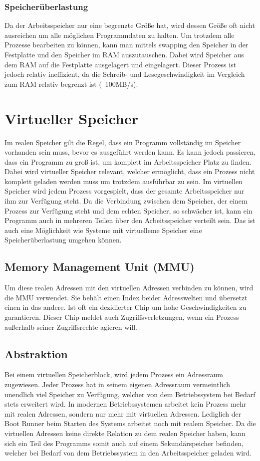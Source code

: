 \documentclass{article}
\begin{document}
	\subsubsection{Speicherüberlastung}
	Da der Arbeitsspeicher nur eine begrenzte Größe hat, wird dessen Größe oft nicht ausreichen um alle möglichen Programmdaten zu halten. Um trotzdem alle Prozesse bearbeiten zu können, kann man mittels swapping den Speicher in der Festplatte und den Speicher im RAM auszutauschen. Dabei wird Speicher aus dem RAM auf die Festplatte ausgelagert und eingelagert. Dieser Prozess ist jedoch relativ ineffizient, da die Schreib- und Lesegeschwindigkeit im Vergleich zum RAM relativ begrenzt ist (~{}100MB/s).
	\section{Virtueller Speicher}
	Im realen Speicher gilt die Regel, dass ein Programm vollständig im Speicher vorhanden sein muss, bevor es ausgeführt werden kann. Es kann jedoch passieren, dass ein Programm zu groß ist, um komplett im Arbeitsspeicher Platz zu finden. Dabei wird virtueller Speicher relevant, welcher ermöglicht, dass ein Prozess nicht komplett geladen werden muss um trotzdem ausführbar zu sein. Im virtuellen Speicher wird jedem Prozess vorgespielt, dass der gesamte Arbeitsspeicher nur ihm zur Verfügung steht. Da die Verbindung zwischen dem Speicher, der einem Prozess zur Verfügung steht und dem echten Speicher, so schwächer ist, kann ein Programm auch in mehreren Teilen über den Arbeitsspeicher verteilt sein. Das ist auch eine Möglichkeit wie Systeme mit virtuelleme Speicher eine Speicherüberlastung umgehen können.
	\subsection{Memory Management Unit (MMU)}
	Um diese realen Adressen mit den virtuellen Adressen verbinden zu können, wird die MMU verwendet. Sie behält einen Index beider Adresswelten und übersetzt einen in das andere. Ist oft ein dezidierter Chip um hohe Geschwindigkeiten zu garantieren. Dieser Chip meldet auch Zugriffsverletzungen, wenn ein Prozess außerhalb seiner Zugriffsrechte agieren will.
	\subsection{Abstraktion}
	Bei einem virtuellen Speicherblock, wird jedem Prozess ein Adressraum zugewiesen. Jeder Prozess hat in seinem eigenen Adressraum vermeintlich unendlich viel Speicher zu Verfügung, welcher von dem Betriebssystem bei Bedarf stets erweitert wird. In modernen Betriebssystemen arbeitet kein Prozess mehr mit realen Adressen, sondern nur mehr mit virtuellen Adressen. Lediglich der Boot Runner beim Starten des Systems arbeitet noch mit realem Speicher. Da die virtuellen Adressen keine direkte Relation zu dem realen Speicher haben, kann sich ein Teil des Programms somit auch auf einem Sekundärspeicher befinden, welcher bei Bedarf von dem Betriebssystem in den Arbeitsspeicher geladen wird.
\end{document}
